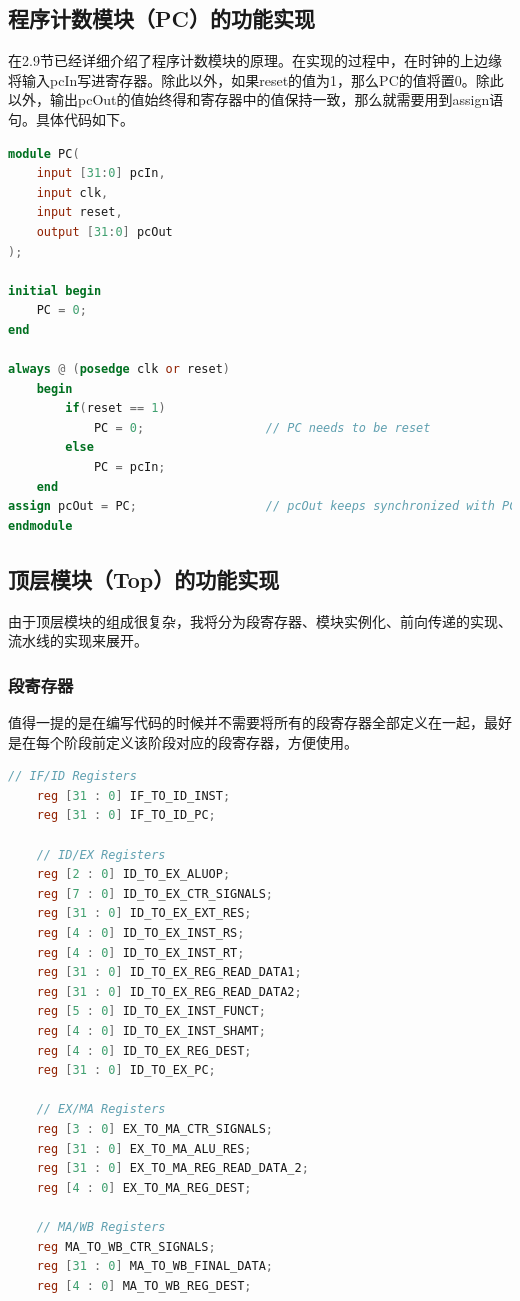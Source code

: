 \subsection{程序计数模块（PC）的功能实现}
在2.9节已经详细介绍了程序计数模块的原理。在实现的过程中，在时钟的上边缘将输入pcIn写进寄存器。除此以外，如果reset的值为1，那么PC的值将置0。除此以外，输出pcOut的值始终得和寄存器中的值保持一致，那么就需要用到assign语句。具体代码如下。
\begin{lstlisting}[language=Verilog]
module PC(
    input [31:0] pcIn,
    input clk,
    input reset,
    output [31:0] pcOut
);
    
initial begin
    PC = 0;
end

always @ (posedge clk or reset)
    begin
        if(reset == 1)
            PC = 0;                 // PC needs to be reset
        else
            PC = pcIn;
    end
assign pcOut = PC;                  // pcOut keeps synchronized with PC
endmodule
\end{lstlisting}

\subsection{顶层模块（Top）的功能实现}
由于顶层模块的组成很复杂，我将分为段寄存器、模块实例化、前向传递的实现、流水线的实现来展开。
\subsubsection{段寄存器}
值得一提的是在编写代码的时候并不需要将所有的段寄存器全部定义在一起，最好是在每个阶段前定义该阶段对应的段寄存器，方便使用。
\begin{lstlisting}[language=Verilog]
    // IF/ID Registers
    reg [31 : 0] IF_TO_ID_INST;
    reg [31 : 0] IF_TO_ID_PC;

    // ID/EX Registers
    reg [2 : 0] ID_TO_EX_ALUOP;
    reg [7 : 0] ID_TO_EX_CTR_SIGNALS;
    reg [31 : 0] ID_TO_EX_EXT_RES;
    reg [4 : 0] ID_TO_EX_INST_RS;        
    reg [4 : 0] ID_TO_EX_INST_RT;        
    reg [31 : 0] ID_TO_EX_REG_READ_DATA1;
    reg [31 : 0] ID_TO_EX_REG_READ_DATA2;
    reg [5 : 0] ID_TO_EX_INST_FUNCT;
    reg [4 : 0] ID_TO_EX_INST_SHAMT;
    reg [4 : 0] ID_TO_EX_REG_DEST;
    reg [31 : 0] ID_TO_EX_PC;

    // EX/MA Registers
    reg [3 : 0] EX_TO_MA_CTR_SIGNALS;
    reg [31 : 0] EX_TO_MA_ALU_RES;
    reg [31 : 0] EX_TO_MA_REG_READ_DATA_2;
    reg [4 : 0] EX_TO_MA_REG_DEST;

    // MA/WB Registers
    reg MA_TO_WB_CTR_SIGNALS;
    reg [31 : 0] MA_TO_WB_FINAL_DATA;
    reg [4 : 0] MA_TO_WB_REG_DEST;
\end{lstlisting}

